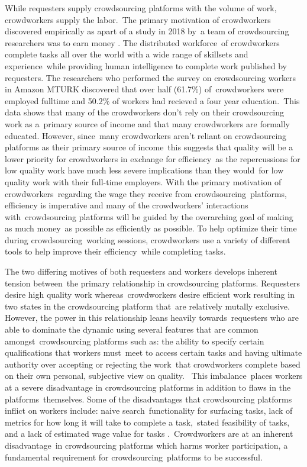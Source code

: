 \documentclass[letterpaper,12pt]{article}
\begin{document}
While requesters supply crowdsourcing platforms with the volume of work, crowdworkers supply the labor.\
The primary motivation of crowdworkers discovered empirically as apart of a study in 2018 by\
a team of crowdsourcing researchers was to earn money \cite{Kaplan2018}. The distributed workforce\
of crowdworkers complete tasks all over the world with a wide range of skillsets and experience\
while providing human intelligence to complete work published by requesters. The researchers
who performed the survey on crowdsourcing workers in Amazon MTURK discovered that over half (61.7\%) of\
crowdworkers were employed fulltime and 50.2\% of workers had recieved a four year education.\cite{Kaplan2018}\
This data shows that many of the crowdworkers don't rely on their crowdsourcing work as a\
primary source of income and that many crowdworkers are formally educated. However, since\
many crowdworkers aren't reliant on crowdsourcing platforms as their primary source of income\
this suggests that quality will be a lower priority for crowdworkers in exchange for efficiency\
as the repercussions for low quality work have much less severe implications than they would\
for low quality work with their full-time employers. With the primary motivation of crowdworkers\
regarding the wage they receive from crowdsourcing\
platforms, efficiency is imperative and many of the crowdworkers' interactions with\
crowdsourcing platforms will be guided by the overarching goal of making as much money\
as possible as efficiently as possible. To help optimize their time during crowdsourcing\
working sessions, crowdworkers use a variety of different tools to help improve their efficiency\
while completing tasks.


The two differing motives of both requesters and workers develops inherent tension between\
the primary relationship in crowdsourcing platforms. Requesters desire high quality work whereas\
crowdworkers desire efficient work resulting in two states in the crowdsourcing platform that\
are relatively mutally exclusive. However, the power in this relationship leans heavily towards\
requesters who are able to dominate the dynamic using several features that are common amongst\
crowdsourcing platforms such as: the ability to specify certain qualifications that workers must\
meet to access certain tasks and having ultimate authority over accepting or rejecting the work\
that crowdworkers complete based on their own personal, subjective view on quality. \cite{Kaplan2018,allahbakhsh2013quality}\
This imbalance\
places workers at a severe disadvantage in crowdsourcing platforms in addition to flaws in the platforms\
themselves. Some of the disadvantages that crowdsourcing platforms inflict on workers include: naive search\
functionality for surfacing tasks, lack of metrics for how long it will take to complete a task,\
stated feasibility of tasks, and a lack of estimated wage value for tasks \cite{Kaplan2018}.\
Crowdworkers are at an inherent disadvantage\
in crowdsourcing platforms which harms worker participation, a fundamental requirement for crowdsourcing\
platforms to be successful.
\end{document}
